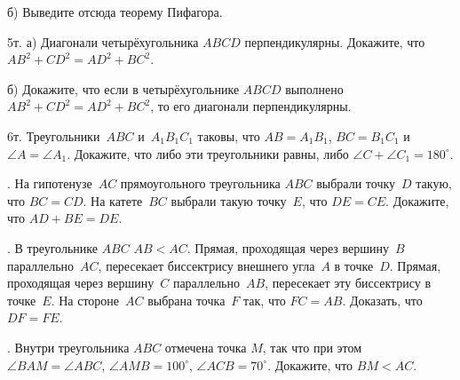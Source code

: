 б) Выведите отсюда теорему Пифагора.



\q5т. а) Диагонали четырёхугольника $ABCD$ перпендикулярны. Докажите, что $AB^2+CD^2=AD^2+BC^2$.


б) Докажите, что если в четырёхугольнике $ABCD$ выполнено $AB^2+CD^2=AD^2+BC^2$, то его диагонали перпендикулярны. 


\q6т. Треугольники~$ABC$ и~$A_1B_1C_1$ таковы, что $AB=A_1B_1$,
\quad $BC=B_1C_1$
и~$\angle A = \angle A_1$. Докажите, что либо эти треугольники равны, либо
$\angle C + \angle C_1 = 180^{\circ}$.

. На гипотенузе~$AC$ прямоугольного треугольника $ABC$ выбрали точку~$D$
такую, что $BC=CD$. На катете~$BC$ выбрали такую точку~$E$, что $DE=CE$.
Докажите, что $AD+BE=DE$.


.  В треугольнике $ABC$ \quad $AB<AC$. Прямая, проходящая через вершину~$B$ параллельно~$AC$, пересекает
биссектрису внешнего угла~$A$ в точке~$D$. Прямая, проходящая через вершину~$C$ параллельно~$AB$, пересекает
эту биссектрису в точке~$E$. На стороне~$AC$ выбрана точка~$F$ так, что $FC=AB$.  Доказать, что $DF=FE$.



. Внутри треугольника $ABC$ отмечена точка $M$, так что при этом
$\angle  BAM=\angle ABC$, $\angle AMB=100^{\circ}$,
$\angle ACB=70^\circ$. Докажите, что $BM<AC$.
